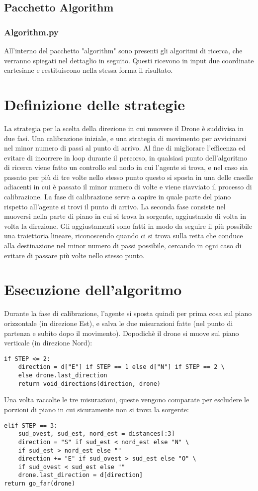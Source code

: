 \subsection{Pacchetto Algorithm}

\subsubsection{Algorithm.py}
All'interno del pacchetto "algorithm" sono presenti gli algoritmi di ricerca, che verranno spiegati nel dettaglio in seguito. Questi ricevono in input due coordinate cartesiane e restituiscono nella stessa forma il risultato.
	
\section{Definizione delle strategie}
La strategia per la scelta della direzione in cui muovere il Drone è suddivisa in due fasi. Una calibrazione iniziale, e una strategia di movimento per avvicinarsi nel minor numero di passi al punto di arrivo. Al fine di migliorare l'efficenza ed evitare di incorrere in loop durante il percorso, in qualsiasi punto dell'algoritmo di ricerca viene fatto un controllo sul nodo in cui l'agente si trova, e nel caso sia passato per più di tre volte nello stesso punto questo si sposta in una delle caselle adiacenti in cui è passato il minor numero di volte e viene riavviato il processo di calibrazione.
La fase di calibrazione serve a capire in quale parte del piano rispetto all'agente si trovi il punto di arrivo. 
La seconda fase consiste nel muoversi nella parte di piano in cui si trova la sorgente, aggiustando di volta in volta la direzione. Gli aggiustamenti sono fatti in modo da seguire il più possibile una traiettoria lineare, riconoscendo quando ci si trova sulla retta che conduce alla destinazione nel minor numero di passi possibile, cercando in ogni caso di evitare di passare più volte nello stesso punto.
	
\section{Esecuzione dell'algoritmo}
Durante la fase di calibrazione, l'agente si sposta quindi per prima cosa sul piano orizzontale (in direzione Est), e salva le due misurazioni fatte (nel punto di partenza e subito dopo il movimento). Dopodichè il drone si muove sul piano verticale (in direzione Nord): 
\begin{verbatim}
if STEP <= 2:
    direction = d["E"] if STEP == 1 else d["N"] if STEP == 2 \
    else drone.last_direction
    return void_directions(direction, drone)
\end{verbatim}
Una volta raccolte le tre misurazioni, queste vengono comparate per escludere le porzioni di piano in cui sicuramente non si trova la sorgente:
\begin{verbatim}
elif STEP == 3:
    sud_ovest, sud_est, nord_est = distances[:3]
    direction = "S" if sud_est < nord_est else "N" \
    if sud_est > nord_est else ""
    direction += "E" if sud_ovest > sud_est else "O" \
    if sud_ovest < sud_est else ""
    drone.last_direction = d[direction]
return go_far(drone)
\end{verbatim}

